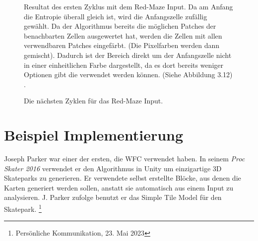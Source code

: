 \documentclass[12pt, a4paper,twoside,openright]{report} %
\begin{document}
\begin{figure}[H]
    \centering
    \caption{
        Resultat des ersten Zyklus mit dem Red-Maze Input. Da am Anfang die Entropie überall gleich ist, wird die Anfangszelle zufällig gewählt.
        Da der Algorithmus bereits die möglichen Patches der benachbarten Zellen ausgewertet hat, werden die Zellen mit allen verwendbaren Patches eingefärbt.
        {(Die Pixelfarben werden dann gemischt)}.
        Dadurch ist der Bereich direkt um der Anfangszelle nicht in einer einheitlichen Farbe dargestellt, da es dort bereits weniger Optionen gibt die verwendet werden können.
        {(Siehe Abbildung 3.12)} \cite{Karth2017WaveFunctionCollapseIC}.
    }%
\end{figure}

\begin{figure}[H]
    \centering
    \caption{Die nächsten Zyklen für das Red-Maze Input. \cite{Karth2017WaveFunctionCollapseIC}}%
\end{figure}

\section{Beispiel Implementierung}

Joseph Parker war einer der ersten, die WFC verwendet haben.
In seinem \textit{Proc Skater 2016} verwendet er den Algorithmus in Unity um einzigartige 3D Skateparks zu generieren.
Er verwendete selbst erstellte Blöcke, aus denen die Karten generiert werden sollen, anstatt sie automatisch aus einem Input zu analysieren. \cite{procskater2016}
J. Parker zufolge benutzt er das Simple Tile Model für den Skatepark. \footnote[5]{Persönliche Kommunikation, 23. Mai 2023}
\end{document}
